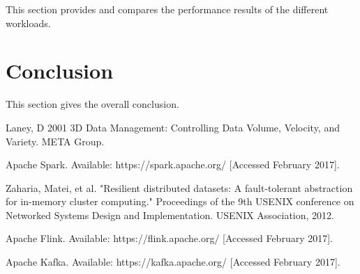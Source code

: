 \documentclass[]{article}
\begin{document}
This section provides and compares the performance results of the different workloads.

\section{Conclusion}
This section gives the overall conclusion.


\begin{thebibliography}{[MT1]}
%
Laney, D 2001 3D Data Management: Controlling Data Volume, Velocity, and Variety. META Group.

Apache Spark. Available: https://spark.apache.org/ [Accessed February 2017].

Zaharia, Matei, et al. "Resilient distributed datasets: A fault-tolerant abstraction for in-memory cluster computing." Proceedings of the 9th USENIX conference on Networked Systems Design and Implementation. USENIX Association, 2012.

Apache Flink. Available: https://flink.apache.org/ [Accessed February 2017].

Apache Kafka. Available: https://kafka.apache.org/ [Accessed February 2017].


%
\end{thebibliography}
\end{document}
